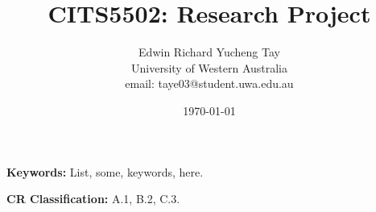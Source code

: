 \documentclass[12pt, a4paper, titlepage]{article}
\title{CITS5502: Research Project}
\author{Edwin Richard Yucheng Tay \\
University of Western Australia \\
email: taye03@student.uwa.edu.au }
\date{\today}
\newcommand{\FIXME}{{\bf FIXME}}
\begin{document}



{\bf Keywords:} List, some, keywords, here.

{\bf CR Classification:} A.1, B.2, C.3.

\pagebreak










\end{document}
